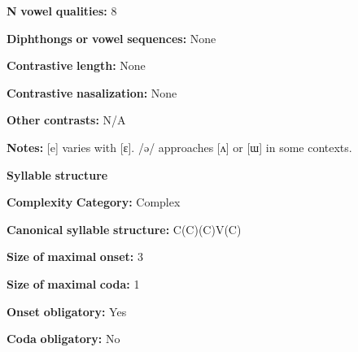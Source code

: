 \documentclass[output=paper]{langsci/langscibook}
\begin{document}
\begin{styleBody}
\textbf{N} \textbf{vowel} \textbf{qualities:} 8
\end{styleBody}

\begin{styleBody}
\textbf{Diphthongs} \textbf{or} \textbf{vowel} \textbf{sequences:} None
\end{styleBody}

\begin{styleBody}
\textbf{Contrastive} \textbf{length:} None
\end{styleBody}

\begin{styleBody}
\textbf{Contrastive} \textbf{nasalization:} None
\end{styleBody}

\begin{styleBody}
\textbf{Other} \textbf{contrasts:} N/A
\end{styleBody}

\begin{styleBody}
\textbf{Notes:} [e] varies with [ɛ]. /ə/ approaches [ʌ] or [ɯ] in some contexts.
\end{styleBody}

\begin{styleBody}
\textbf{Syllable} \textbf{structure}
\end{styleBody}

\begin{styleBody}
\textbf{Complexity} \textbf{Category:} Complex
\end{styleBody}

\begin{styleBody}
\textbf{Canonical} \textbf{syllable} \textbf{structure:} C(C)(C)V(C) \citep[30-32]{Plaisier2007}
\end{styleBody}

\begin{styleBody}
\textbf{Size} \textbf{of} \textbf{maximal} \textbf{onset:} 3
\end{styleBody}

\begin{styleBody}
\textbf{Size} \textbf{of} \textbf{maximal} \textbf{coda:} 1
\end{styleBody}

\begin{styleBody}
\textbf{Onset} \textbf{obligatory:} Yes
\end{styleBody}

\begin{styleBody}
\textbf{Coda} \textbf{obligatory:} No
\end{styleBody}
\end{document}
